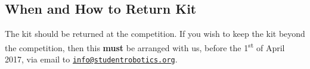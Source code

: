 \subsection {When and How to Return Kit}

The kit should be returned at the competition.
If you wish to keep the kit beyond the competition, then this \textbf{must} be arranged with us,
 before the 1\textsuperscript{st} of April 2017, via email to \href{mailto:info@studentrobotics.org}{\nolinkurl{info@studentrobotics.org}}.
